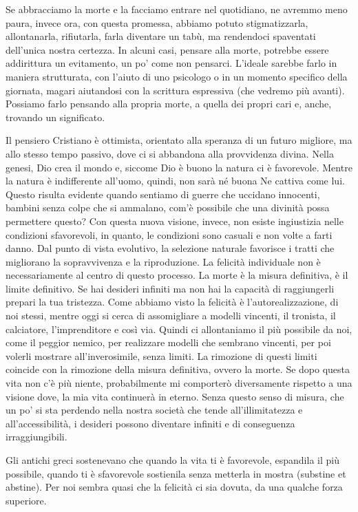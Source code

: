 \documentclass[12pt]{book} %
\begin{document}
Se abbracciamo la morte e la facciamo
entrare nel quotidiano, ne avremmo meno paura, invece ora, con questa promessa, abbiamo potuto stigmatizzarla,
allontanarla, rifiutarla, farla diventare un tabù, ma rendendoci spaventati dell'unica nostra
certezza.
In alcuni casi, pensare alla morte, potrebbe essere addirittura un evitamento, un po' come non pensarci.
L'ideale sarebbe farlo in maniera strutturata, con l'aiuto di uno psicologo o in un momento specifico della giornata, magari aiutandosi con la scrittura espressiva (che vedremo più avanti). Possiamo farlo pensando alla propria morte, a quella dei propri cari e, anche, trovando un significato.

Il pensiero Cristiano è ottimista, orientato alla speranza di un futuro migliore, ma allo stesso tempo passivo, dove ci
si abbandona alla provvidenza divina. Nella genesi, Dio crea il mondo e, siccome Dio è buono la natura ci è favorevole.
Mentre la natura è indifferente all'uomo, quindi, non sarà né buona Ne cattiva come lui. 
Questo risulta evidente quando sentiamo di guerre che uccidano innocenti, bambini senza colpe che si ammalano, com'è possibile che una divinità possa permettere questo? Con questa nuova visione, invece, non
esiste ingiustizia nelle condizioni sfavorevoli, in quanto, le condizioni sono casuali e non volte a farti danno. Dal punto di vista evolutivo, la selezione naturale favorisce i tratti che migliorano la sopravvivenza e la riproduzione. La felicità individuale non è necessariamente al centro di questo processo. La morte è la misura definitiva, è il limite
definitivo. Se hai desideri infiniti ma non hai la capacità di raggiungerli prepari la tua tristezza. Come abbiamo
visto la felicità è l'autorealizzazione, di noi stessi, mentre oggi si cerca di assomigliare a
modelli vincenti, il tronista, il calciatore, l'imprenditore e così via. Quindi ci allontaniamo il
più possibile da noi, come il peggior nemico, per realizzare modelli che sembrano vincenti, per poi volerli mostrare
all'inverosimile, senza limiti. La rimozione di questi limiti coincide con la rimozione della misura definitiva, ovvero
la morte. Se dopo questa vita non c'è più niente, probabilmente mi comporterò diversamente rispetto a una
visione dove, la mia vita continuerà in eterno. Senza questo senso di misura, che un po' si sta perdendo nella nostra società che tende all'illimitatezza e all'accessibilità, i desideri possono diventare infiniti e di conseguenza irraggiungibili.

Gli antichi greci sostenevano che quando la vita ti è favorevole, espandila il più possibile, quando ti è sfavorevole
sostienila senza metterla in mostra (substine et abstine). Per noi sembra quasi che la felicità ci sia dovuta, da una
qualche forza superiore.
\end{document}
